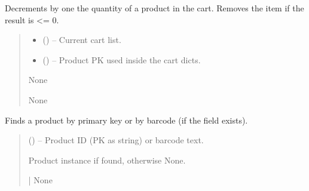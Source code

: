 \documentclass[a4paper,11pt,spanish]{sphinxmanual}
\begin{document}
\begin{fulllineitems}
\label{\detokenize{api/sale/sale.services:sale.services.decrement_cart_item}}
\pysigstartsignatures
\pysiglinewithargsret
{}
{\sphinxparamcomma {}}
{}
\pysigstopsignatures
\sphinxAtStartPar
Decrements by one the quantity of a product in the cart.
Removes the item if the result is <= 0.
\begin{quote}\begin{description}
\begin{itemize}
\item {} 
\sphinxAtStartPar
{} (\sphinxstyleliteralemphasis{\sphinxupquote{{[}}}\sphinxstyleliteralemphasis{\sphinxupquote{{]}}}) – Current cart list.

\item {} 
\sphinxAtStartPar
{} () – Product PK used inside the cart dicts.

\end{itemize}

\sphinxAtStartPar
None

\sphinxAtStartPar
None

\end{description}\end{quote}

\end{fulllineitems}


\begin{fulllineitems}
\label{\detokenize{api/sale/sale.services:sale.services.find_product_by_code}}
\pysigstartsignatures
\pysiglinewithargsret
{}
{}
{}
\pysigstopsignatures
\sphinxAtStartPar
Finds a product by primary key or by barcode (if the field exists).
\begin{quote}\begin{description}
\sphinxAtStartPar
{} () – Product ID (PK as string) or barcode text.

\sphinxAtStartPar
Product instance if found, otherwise None.

\sphinxAtStartPar
{} | None

\end{description}\end{quote}

\end{fulllineitems}
\end{document}
